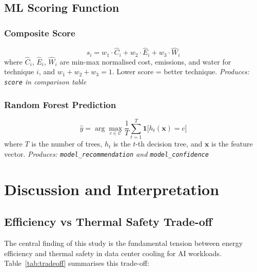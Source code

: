 \documentclass[12pt,a4paper]{report}
\begin{document}
\section{ML Scoring Function}

\subsection{Composite Score}
\begin{equation}
s_i = w_1 \cdot \hat{C}_i + w_2 \cdot \hat{E}_i + w_3 \cdot \hat{W}_i
\label{eq:ml_score}
\end{equation}
where $\hat{C}_i$, $\hat{E}_i$, $\hat{W}_i$ are min-max normalised cost, emissions, and water
for technique $i$, and $w_1 + w_2 + w_3 = 1$. Lower score = better technique.
\textit{Produces: \texttt{score} in comparison table}

\subsection{Random Forest Prediction}
\begin{equation}
\hat{y} = \arg\max_{c \in \mathcal{C}} \frac{1}{T} \sum_{t=1}^{T} \mathbf{1}\bigl[h_t(\mathbf{x}) = c\bigr]
\label{eq:rf}
\end{equation}
where $T$ is the number of trees, $h_t$ is the $t$-th decision tree, and $\mathbf{x}$ is the
feature vector. \textit{Produces: \texttt{model\_recommendation} and \texttt{model\_confidence}}

\newpage

\chapter{Discussion and Interpretation}
\label{ch:discussion}

\section{Efficiency vs Thermal Safety Trade-off}

The central finding of this study is the fundamental tension between energy efficiency and
thermal safety in data center cooling for AI workloads. Table~\ref{tab:tradeoff} summarises
this trade-off:
\end{document}

